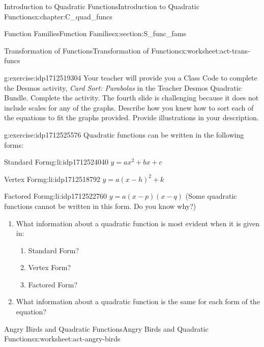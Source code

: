 \documentclass[oneside,10pt,]{book}
\newcommand{\pubtitle}[1]{\textsl{#1}}
\numberwithin{equation}{chapter}
\begin{document}
\begin{chapterptx}{Introduction to Quadratic Functions}{}{Introduction to Quadratic Functions}{}{}{x:chapter:C_quad_funcs}
\begin{sectionptx}{Function Families}{}{Function Families}{}{}{x:section:S_func_fams}
\begin{worksheet-subsection}{Transformation of Functions}{}{Transformation of Functions}{}{}{x:worksheet:act-trans-funcs}
\begin{divisionexercise}{7}{}{}{g:exercise:idp1712519304}
Your teacher will provide you a Class Code to complete the Desmos activity, \pubtitle{Card Sort: Parabolas} in the Teacher Desmos Quadratic Bundle. Complete the activity. The fourth slide is challenging because it does not include scales for any of the graphs. Describe how you knew how to sort each of the equations to fit the graphs provided. Provide illustrations in your description.%
\end{divisionexercise}%
\begin{divisionexercise}{8}{}{}{g:exercise:idp1712525576}%
Quadratic functions can be written in the following forms\textasteriskcentered{}:%
\begin{descriptionlist}
\begin{dlimedium}{Standard Form}{g:li:idp1712524040}%
\(\displaystyle y=ax^2 +bx+c\)%
\end{dlimedium}%
\begin{dlimedium}{Vertex Form}{g:li:idp1712518792}%
\(\displaystyle y=a(x-h)^2 +k\)%
\end{dlimedium}%
\begin{dlimedium}{Factored Form}{g:li:idp1712522760}%
\(y = a(x - p)(x - q)\) (\textasteriskcentered{}Some quadratic functions cannot be written in this form. Do you know why?)%
\end{dlimedium}%
\end{descriptionlist}
%
\begin{enumerate}[font=\bfseries,label=(\alph*),ref=\alph*]
\item{}What information about a quadratic function is most evident when it is given in:%
\begin{enumerate}[font=\bfseries,label=(\roman*),ref=\theenumi.\roman*]
\item{}Standard Form?%
\item{}Vertex Form?%
\item{}Factored Form?%
\end{enumerate}
\item{}What information about a quadratic function is the same for each form of the equation?%
\end{enumerate}
\end{divisionexercise}%
\end{worksheet-subsection}
\restoregeometry
%
%
\typeout{************************************************}
\typeout{************************************************}
%
\begin{worksheet-subsection}{Angry Birds and Quadratic Functions}{}{Angry Birds and Quadratic Functions}{}{}{x:worksheet:act-angry-birds}

\end{worksheet-subsection}
\end{sectionptx}
\end{chapterptx}
\end{document}
